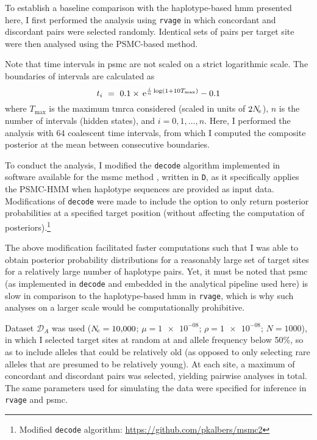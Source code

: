 To establish a baseline comparison with the haplotype-based \gls{hmm} presented here, I first performed the analysis using \texttt{rvage} in which concordant and discordant pairs were selected randomly.
Identical sets of pairs per target site were then analysed using the PSMC-based method.

Note that time intervals in \gls{psmc} are not scaled on a strict logarithmic scale.
The boundaries of intervals are calculated as
\begin{equation}
	t_i~=~0.1\times\,\mathrm{e}^{\frac{i}{n}\log(1 + 10  T_{\max})}-0.1
\end{equation}
where $T_{\max}$ is the maximum \gls{tmrca} considered (scaled in units of $2N_{\!e}$), $n$ is the number of intervals (\ie hidden states), and ${i=0,1,\ldots,n}$.
Here, I performed the analysis with 64 coalescent time intervals, from which I computed the composite posterior at the mean between consecutive boundaries.

To conduct the analysis, I modified the \texttt{decode} algorithm implemented in software available for the \gls{msmc} method \citep{schiffels2014inferring}, written in \texttt{D}, as it specifically applies the PSMC-HMM when  haplotype sequences are provided as input data.
Modifications of \texttt{decode} were made to include the option to only return posterior probabilities at a specified target position (without affecting the computation of posteriors).\footnote{Modified \texttt{decode} algorithm: \url{https://github.com/pkalbers/msmc2} }

The above modification facilitated faster computations such that I was able to obtain posterior probability distributions for a reasonably large set of target sites for a relatively large number of haplotype pairs.
Yet, it must be noted that \gls{psmc} (as implemented in \texttt{decode} and embedded in the analytical pipeline used here) is slow in comparison to the haplotype-based \gls{hmm} in \texttt{rvage}, which is why such analyses on a larger scale would be computationally prohibitive.

Dataset $\mathcal{D}_A$ was used (${N_{\!e}=\num{10000}}$; ${\mu=\num{1e-08}}$; ${\rho=\num{1e-08}}$; ${N=\num{1000}}$), in which I selected  target sites at random at  and allele frequency below 50\%, so as to include alleles that could be relatively old (as opposed to only selecting rare alleles that are presumed to be relatively young).
At each site, a maximum of  concordant and  discordant pairs was selected, yielding  pairwise analyses in total.
The same parameters used for simulating the data were specified for inference in \texttt{rvage} and \gls{psmc}.



